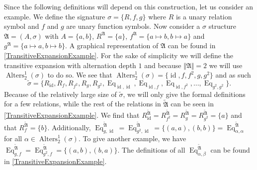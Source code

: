 Since the following definitions will depend on this construction, let us consider an example.
We define the signature $\sigma=\{R,f,g\}$ where $R$ is a unary relation symbol and $f$ and $g$ are unary function symbols.
Now consider a $\sigma$ structure $\mathfrak A=(A,\sigma)$ with $A=\{a,b\}$, $R^{\mathfrak A}=\{a\}$, $f^{\mathfrak A}=\{a\mapsto b, b\mapsto a\}$ and $g^{\mathfrak A}=\{a\mapsto a, b\mapsto b\}$.
A graphical representation of $\mathfrak A$ can be found in \cref{TransitiveExpansionExample}.
For the sake of simplicity we will define the transitive expansion with alternation depth $1$ and because $\Vert\mathfrak A\Vert=2$ we will use $\operatorname{Alters}^1_2(\sigma)$ to do so.
We see that $\operatorname{Alters}^1_2(\sigma)=\{\operatorname{id}, f,f^2,g,g^2\}$ and as such 
$$\widetilde{\sigma}=\{R_{\operatorname{id}}, R_{f}, R_{f^2}, R_g, R_{g^2}, \operatorname{Eq}_{\operatorname{id},\operatorname{id}}, \operatorname{Eq}_{\operatorname{id},f}, \operatorname{Eq}_{\operatorname{id}, f^2}, \dots, \operatorname{Eq}_{g^2, g^2}\}.$$
Because of the relatively large size of $\widetilde{\sigma}$, we will only give the formal definitions for a few relations, while the rest of the relations in $\widetilde{\mathfrak A}$ can be seen in \cref{TransitiveExpansionExample}.
We find that $R^{\widetilde{\mathfrak A}}_{\operatorname{id}}=R^{\widetilde{\mathfrak A}}_{f^2}=R^{\widetilde{\mathfrak A}}_g=R^{\widetilde{\mathfrak A}}_{g^2}=\{a\}$ and that $R^{\widetilde{\mathfrak A}}_f=\{b\}$.
Additionally, $\operatorname{Eq}^{\widetilde{\mathfrak A}}_{g,\operatorname{id}}=\operatorname{Eq}^{\widetilde{\mathfrak A}}_{g^2,\operatorname{id}}=\{(a,a),(b,b)\}=\operatorname{Eq}^{\widetilde{\mathfrak A}}_{\alpha,\alpha}$ for all $\alpha\in\operatorname{Alters}^1_2(\sigma)$.
To give another example, we have $\operatorname{Eq}^{\widetilde{\mathfrak A}}_{g,f}=\operatorname{Eq}^{\widetilde{\mathfrak A}}_{g^2,f}=\{(a,b),(b,a)\}$.
The definitions of all $\operatorname{Eq}^{\widetilde{\mathfrak A}}_{\alpha,\beta}$ can be found in \cref{TransitiveExpansionExample}.

